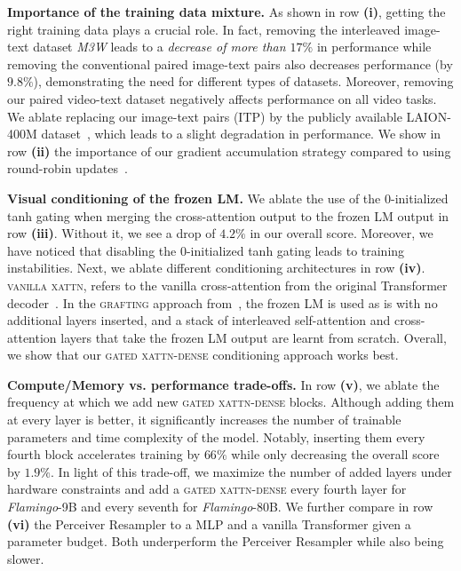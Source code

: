 \textbf{Importance of the training data mixture.} As shown in row \textbf{(i)}, getting the right training data plays a crucial role. In fact, removing the interleaved image-text dataset \emph{M3W} leads to a \emph{decrease of more than $17\%$} in performance while removing the conventional paired image-text pairs also decreases performance (by $9.8\%$), demonstrating the need for different types of datasets. Moreover, removing our paired video-text dataset negatively affects performance on all video tasks. We ablate replacing our image-text pairs (ITP) by the publicly available LAION-400M dataset~\cite{schuhmann2021laion}, which leads to a slight degradation in performance. We show in row \textbf{(ii)} the importance of our gradient accumulation strategy compared to using round-robin updates~\citep{cho2021unifying}.

\textbf{Visual conditioning of the frozen LM.} We ablate the use of the 0-initialized tanh gating when merging the cross-attention output to the frozen LM output in row \textbf{(iii)}.
Without it, we see a drop of $4.2\%$ in our overall score. Moreover, we have noticed that disabling the 0-initialized tanh gating leads to training instabilities. Next, we ablate different conditioning architectures in row \textbf{(iv)}.
\textsc{vanilla xattn}, refers to the vanilla cross-attention from the original Transformer decoder~\citep{vaswani2017attention}. In the \textsc{grafting} approach from~\cite{luo2022vc}, the frozen LM is used as is with no additional layers inserted, and a stack of interleaved self-attention and cross-attention layers that take the frozen LM output are learnt from scratch. Overall, we show that our \textsc{gated xattn-dense} conditioning approach works best.

\textbf{Compute/Memory vs. performance trade-offs.} In row \textbf{(v)}, we ablate the frequency at which we add new \textsc{gated xattn-dense} blocks. Although adding them at every layer is better, it significantly increases the number of trainable parameters and time complexity of the model. Notably, inserting them every fourth block accelerates training by $66\%$ while only decreasing the overall score by $1.9\%$.
In light of this trade-off, we maximize the number of added layers under hardware constraints and add a \textsc{gated xattn-dense} every fourth layer for \emph{Flamingo}-9B and every seventh for \emph{Flamingo}-80B.
We further compare in row \textbf{(vi)} the Perceiver Resampler to a MLP and a vanilla Transformer given a parameter budget. Both underperform the Perceiver Resampler while also being slower.

